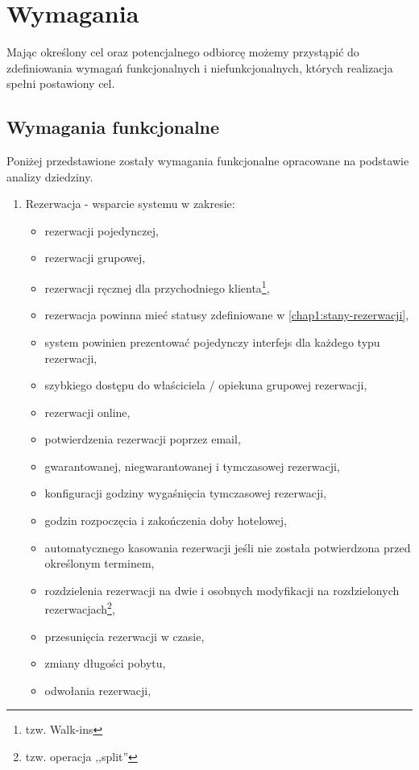 \documentclass[a4paper,onecolumn,oneside,11pt,wide,floatssmall]{mwrep}
\theoremstyle{definition}
\theoremstyle{plain}%
\theoremstyle{remark}
\begin{document}
\section{Wymagania}
Mając określony cel oraz potencjalnego odbiorcę możemy przystąpić do zdefiniowania wymagań funkcjonalnych i niefunkcjonalnych, których realizacja spełni postawiony cel.

\subsection{Wymagania funkcjonalne}
Poniżej przedstawione zostały wymagania funkcjonalne opracowane na podstawie analizy dziedziny.

\begin{enumerate}
  \item Rezerwacja - wsparcie systemu w zakresie:
    \begin{itemize}
      \item rezerwacji pojedynczej,
      \item rezerwacji grupowej,
      \item rezerwacji ręcznej dla przychodniego klienta\footnote{tzw. Walk-ins},
      \item rezerwacja powinna mieć statusy zdefiniowane w \ref{chap1:stany-rezerwacji},
      \item system powinien prezentować pojedynczy interfejs dla każdego typu rezerwacji,
      \item szybkiego dostępu do właściciela / opiekuna grupowej rezerwacji,
      \item rezerwacji online,
      \item potwierdzenia rezerwacji poprzez email,
      \item gwarantowanej, niegwarantowanej i tymczasowej rezerwacji,
      \item konfiguracji godziny wygaśnięcia tymczasowej rezerwacji,
      \item godzin rozpoczęcia i zakończenia doby hotelowej,
      \item automatycznego kasowania rezerwacji jeśli nie została potwierdzona przed określonym terminem,
      \item rozdzielenia rezerwacji na dwie i osobnych modyfikacji na rozdzielonych rezerwacjach\footnote{tzw. operacja ,,split''},
      \item przesunięcia rezerwacji w czasie,
      \item zmiany długości pobytu,
      \item odwołania rezerwacji,

\end{itemize}
\end{enumerate}
\end{document}
